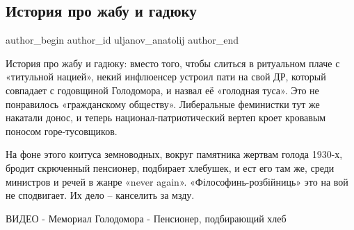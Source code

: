  
 
 
 
 
 
\subsection{История про жабу и гадюку}
\label{sec:01_12_2021.fb.uljanov_anatolij.1.istoria_pro_zhabu_i_gadjuku}
 
\ifcmt
 author_begin
   author_id uljanov_anatolij
 author_end
\fi


История про жабу и гадюку: вместо того, чтобы слиться в ритуальном плаче с
«титульной нацией», некий инфлюенсер устроил пати на свой ДР, который совпадает
с годовщиной Голодомора, и назвал её «голодная туса». Это не понравилось
«гражданскому обществу». Либеральные феминистки тут же накатали донос, и теперь
национал-патриотический вертеп кроет кровавым поносом горе-тусовщиков. 

На фоне этого коитуса земноводных, вокруг памятника жертвам голода 1930-х,
бродит скрюченный пенсионер, подбирает хлебушек, и ест его там же, среди
министров и речей в жанре «never again». «Філософинь-розбійниць» это на вой не
сподвигает. Их дело – канселить за мзду.

ВИДЕО - Мемориал Голодомора - Пенсионер, подбирающий хлеб

